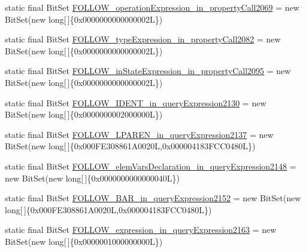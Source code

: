 \begin{DoxyCompactItemize}
\item 
static final Bit\-Set \hyperlink{classorg_1_1tzi_1_1use_1_1parser_1_1testsuite_1_1_test_suite_parser_a0607501da0b2eeda6981839acdfdaed0}{F\-O\-L\-L\-O\-W\-\_\-operation\-Expression\-\_\-in\-\_\-property\-Call2069} = new Bit\-Set(new long\mbox{[}$\,$\mbox{]}\{0x0000000000000002\-L\})
\item 
static final Bit\-Set \hyperlink{classorg_1_1tzi_1_1use_1_1parser_1_1testsuite_1_1_test_suite_parser_a0ee6429765b6e12a8e70b10fda20c452}{F\-O\-L\-L\-O\-W\-\_\-type\-Expression\-\_\-in\-\_\-property\-Call2082} = new Bit\-Set(new long\mbox{[}$\,$\mbox{]}\{0x0000000000000002\-L\})
\item 
static final Bit\-Set \hyperlink{classorg_1_1tzi_1_1use_1_1parser_1_1testsuite_1_1_test_suite_parser_afc3ed8c6d1dc767e8dffca559d7d3293}{F\-O\-L\-L\-O\-W\-\_\-in\-State\-Expression\-\_\-in\-\_\-property\-Call2095} = new Bit\-Set(new long\mbox{[}$\,$\mbox{]}\{0x0000000000000002\-L\})
\item 
static final Bit\-Set \hyperlink{classorg_1_1tzi_1_1use_1_1parser_1_1testsuite_1_1_test_suite_parser_ac2761ad8e612b203545f74e3bb511e47}{F\-O\-L\-L\-O\-W\-\_\-\-I\-D\-E\-N\-T\-\_\-in\-\_\-query\-Expression2130} = new Bit\-Set(new long\mbox{[}$\,$\mbox{]}\{0x0000000002000000\-L\})
\item 
static final Bit\-Set \hyperlink{classorg_1_1tzi_1_1use_1_1parser_1_1testsuite_1_1_test_suite_parser_a7ff772319b042d211419849fb3affc05}{F\-O\-L\-L\-O\-W\-\_\-\-L\-P\-A\-R\-E\-N\-\_\-in\-\_\-query\-Expression2137} = new Bit\-Set(new long\mbox{[}$\,$\mbox{]}\{0x000\-F\-E308861\-A0020\-L,0x000004183\-F\-C\-C0480\-L\})
\item 
static final Bit\-Set \hyperlink{classorg_1_1tzi_1_1use_1_1parser_1_1testsuite_1_1_test_suite_parser_ae75af3c87a576112bd4abe7ed8eb6fbe}{F\-O\-L\-L\-O\-W\-\_\-elem\-Vars\-Declaration\-\_\-in\-\_\-query\-Expression2148} = new Bit\-Set(new long\mbox{[}$\,$\mbox{]}\{0x0000000000000040\-L\})
\item 
static final Bit\-Set \hyperlink{classorg_1_1tzi_1_1use_1_1parser_1_1testsuite_1_1_test_suite_parser_a53c4e00dd1561fee707af6d67a9ffb64}{F\-O\-L\-L\-O\-W\-\_\-\-B\-A\-R\-\_\-in\-\_\-query\-Expression2152} = new Bit\-Set(new long\mbox{[}$\,$\mbox{]}\{0x000\-F\-E308861\-A0020\-L,0x000004183\-F\-C\-C0480\-L\})
\item 
static final Bit\-Set \hyperlink{classorg_1_1tzi_1_1use_1_1parser_1_1testsuite_1_1_test_suite_parser_a493f966eec6dbfa58d2c54875e879bad}{F\-O\-L\-L\-O\-W\-\_\-expression\-\_\-in\-\_\-query\-Expression2163} = new Bit\-Set(new long\mbox{[}$\,$\mbox{]}\{0x0000001000000000\-L\})

\end{DoxyCompactItemize}
